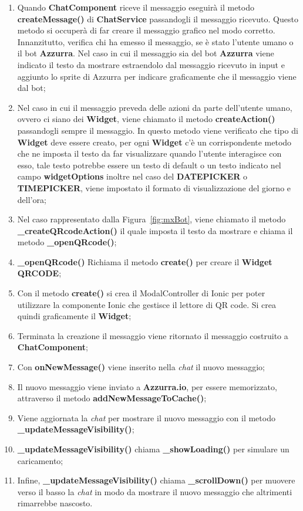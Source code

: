 \begin{enumerate}
	\item Quando \textbf{ChatComponent} riceve il messaggio eseguirà il metodo \textbf{createMessage()} di \textbf{ChatService} passandogli il messaggio ricevuto. Questo metodo si occuperà di far creare il messaggio grafico nel modo corretto.
	Innanzitutto, verifica chi ha emesso il messaggio, se è stato l'utente umano o il bot \textbf{Azzurra}. Nel caso in cui il messaggio sia del bot \textbf{Azzurra} viene indicato il testo da mostrare estraendolo dal messaggio ricevuto in input e aggiunto lo sprite di Azzurra per indicare graficamente che il messaggio viene dal bot;
	\item Nel caso in cui il messaggio preveda delle azioni da parte dell'utente umano, ovvero ci siano dei \textbf{Widget}, viene chiamato il metodo \textbf{createAction()} passandogli sempre il messaggio. In questo metodo viene verificato che tipo di \textbf{Widget} deve essere creato, per ogni \textbf{Widget} c'è un corrispondente metodo che ne imposta il testo da far visualizzare quando l'utente interagisce con esso, tale testo potrebbe essere un testo di default o un testo indicato nel campo \textbf{widgetOptions} inoltre nel caso del \textbf{DATEPICKER} o \textbf{TIMEPICKER}, viene impostato il formato di visualizzazione del giorno e dell'ora;
	\item Nel caso rappresentato dalla Figura~\ref{fig:mxBot}, viene chiamato il metodo \textbf{\_createQRcodeAction()} il quale imposta il testo da mostrare e chiama il metodo \textbf{\_openQRcode()};
	\item \textbf{\_openQRcode()} Richiama il metodo \textbf{create()} per creare il \textbf{Widget} \textbf{QRCODE};
	\item Con il metodo \textbf{create()} si crea il ModalController di Ionic per poter utilizzare la componente Ionic che gestisce il lettore di QR code. Si crea quindi graficamente il \textbf{Widget};
	\item Terminata la creazione il messaggio viene ritornato il messaggio costruito a \textbf{ChatComponent};
	\item Con \textbf{onNewMessage()} viene inserito nella \emph{chat} il nuovo messaggio;
	\item Il nuovo messaggio viene inviato a \textbf{Azzurra.io}, per essere memorizzato, attraverso il metodo \textbf{addNewMessageToCache()};
	\item Viene aggiornata la \emph{chat} per mostrare il nuovo messaggio con il metodo \textbf{\_updateMessageVisibility()};
	\item \textbf{\_updateMessageVisibility()} chiama \textbf{\_showLoading()} per simulare un caricamento;
	\item Infine, \textbf{\_updateMessageVisibility()} chiama \textbf{\_scrollDown()} per muovere verso il basso la \emph{chat} in modo da mostrare il nuovo messaggio che altrimenti rimarrebbe nascosto.
\end{enumerate}

